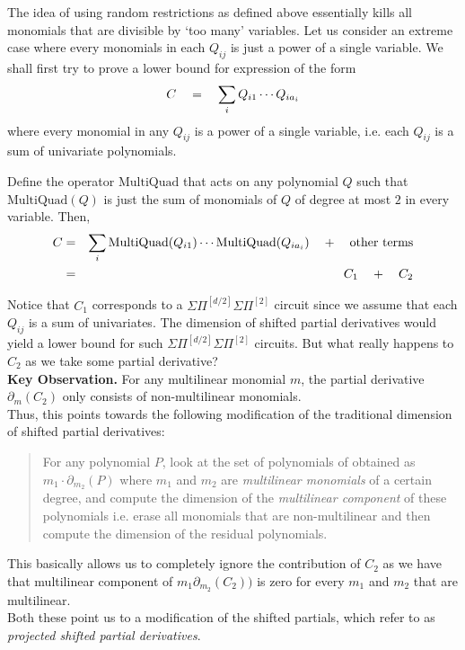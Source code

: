 \documentclass[12pt]{report}
\newcommand{\SPSPfanin}[2]{\Sigma\Pi^{[#1]}\Sigma\Pi^{[#2]}}
\begin{document}
The idea of using random restrictions as defined above essentially kills all monomials that are divisible by `too many' variables. Let us consider an extreme case where every monomials in each $Q_{ij}$ is just a power of a single variable. We shall first try to prove a lower bound for expression of the form
\[
C\quad = \quad \sum_{i}Q_{i1}\cdots Q_{ia_i}
\]
where every monomial in any $Q_{ij}$ is a power of a single variable, i.e. each $Q_{ij}$ is a sum of univariate polynomials. 

Define the operator $\mathrm{MultiQuad}$ that acts on any polynomial $Q$ such that $\mathrm{MultiQuad}(Q)$ is just the sum of monomials of $Q$ of degree at most $2$ in every variable. Then,
\begin{eqnarray*}
C &=&  \sum_{i}\mathrm{MultiQuad}(Q_{i1})\cdots \mathrm{MultiQuad}(Q_{ia_i}) \quad + \quad \text{other terms}\\
  & = & \qquad C_1 \quad + \quad C_2
\end{eqnarray*}

Notice that $C_1$ corresponds to a $\SPSPfanin{d/2}{2}$ circuit since we assume that each $Q_{ij}$ is a sum of univariates. The dimension of shifted partial derivatives would yield a lower bound for such $\SPSPfanin{d/2}{2}$ circuits. But what really happens to $C_2$ as we take some partial derivative?\\

{\bf Key Observation. } For any multilinear monomial $m$, the partial derivative $\partial_m(C_2)$ only consists of non-multilinear monomials. \\

Thus, this points towards the following modification of the traditional dimension of shifted partial derivatives: 
\begin{quote}
  For any polynomial $P$, look at the set of polynomials of obtained as $m_1 \cdot \partial_{m_2}(P)$ where $m_1$ and $m_2$ are \emph{multilinear monomials} of a certain degree, and compute the dimension of the \emph{multilinear component} of these polynomials i.e. erase all monomials that are non-multilinear and then compute the dimension of the residual polynomials. 
\end{quote}
This basically allows us to completely ignore the contribution of $C_2$ as we have that multilinear component of $m_1 \partial_{m_2}(C_2))$ is zero for every $m_1$ and $m_2$ that are multilinear. \\


Both these point us to a modification of the shifted partials, which \cite{KLSS,KS14} refer to as \emph{projected shifted partial derivatives}. 
\end{document}
